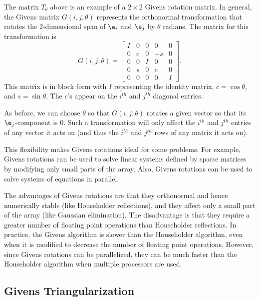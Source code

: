 The matrix $T_{\theta}$ above is an example of a $2 \times 2$ Givens rotation matrix.
In general, the Givens matrix $G(i,j,\theta)$ represents the orthonormal transformation that rotates the 2-dimensional span of $\e_i$ and $\e_j$ by $\theta$ radians.
The matrix for this transformation is
\begin{equation*}
G(i,j,\theta) =
\left[\begin{array}{ccccc}
I & 0 & 0 & 0 & 0 \\
0 & c & 0 & -s & 0 \\
0 & 0 & I & 0 & 0 \\
0 & s & 0 & c & 0 \\
0 & 0 & 0 & 0 & I
\end{array}\right].
\end{equation*}
This matrix is in block form with $I$ representing the identity matrix, $c=\cos \theta$, and $s=\sin \theta$.
The $c$'s appear on the $i^{th}$ and $j^{th}$ diagonal entries.

As before, we can choose $\theta$ so that $G(i,j,\theta)$ rotates a given vector so that its $\e_j$-component is 0.
Such a transformation will only affect the $i^{th}$ and $j^{th}$ entries of any vector it acts on (and thus the $i^{th}$ and $j^{th}$ rows of any matrix it acts on).

This flexibility makes Givens rotations ideal for some problems.
For example, Givens rotations can be used to solve linear systems defined by sparse matrices by modifying only small parts of the array.
Also, Givens rotations can be used to solve systems of equations in parallel.

The advantages of Givens rotations are that they orthonormal and hence numerically stable (like Householder reflections), and they affect only a small part of the array (like Gaussian elimination).
The disadvantage is that they require a greater number of floating point operations than Householder reflections.
In practice, the Givens algorithm is slower than the Householder algorithm, even when it is modified to decrease the number of floating point operations.
However, since Givens rotations can be parallelized, they can be much faster than the Householder algorithm when multiple processors are used.

\subsection*{Givens Triangularization} %

